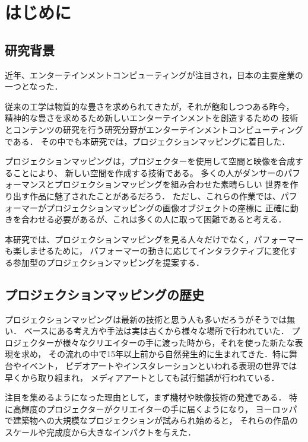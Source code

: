 \chapter{はじめに}
\thispagestyle{fancy}
\setcounter{page}{1}
\renewcommand{\thepage}{\arabic{page}}

\section{研究背景}
近年、エンターテインメントコンピューティングが注目され，日本の主要産業の一つとなった．

従来の工学は物質的な豊さを求められてきたが，それが飽和しつつある昨今，
精神的な豊さを求めるため新しいエンターテインメントを創造するための
技術とコンテンツの研究を行う研究分野がエンターテインメントコンピューティングである．
その中でも本研究では，プロジェクションマッピングに着目した．

プロジェクションマッピングは，プロジェクターを使用して空間と映像を合成することにより、
新しい空間を作成する技術である。
多くの人がダンサーのパフォーマンスとプロジェクションマッピングを組み合わせた素晴らしい
世界を作り出す作品に魅了されたことがあるだろう．
ただし、これらの作業では、パフォーマーがプロジェクションマッピングの画像オブジェクトの座標に
正確に動きを合わせる必要があるが、これは多くの人に取って困難であると考える．

本研究では、プロジェクションマッピングを見る人々だけでなく，パフォーマーも楽しませるために，
パフォーマーの動きに応じてインタラクティブに変化する参加型のプロジェクションマッピングを提案する．



\section{プロジェクションマッピングの歴史}
プロジェクションマッピングは最新の技術と思う人も多いだろうがそうでは無い．
ベースにある考え方や手法は実は古くから様々な場所で行われていた．
プロジェクターが様々なクリエイターの手に渡った時から，それを使った新たな表現を求め，
その流れの中で15年以上前から自然発生的に生まれてきた．特に舞台やイベント，
ビデオアートやインスタレーションといわれる表現の世界では早くから取り組まれ，
メディアアートとしても試行錯誤が行われている．

注目を集めるようになった理由として，まず機材や映像技術の発達である．
特に高輝度のプロジェクターがクリエイターの手に届くようになり，
ヨーロッパで建築物への大規模なプロジェクションが試みられ始めると，
それらの作品のスケールや完成度から大きなインパクトを与えた．

